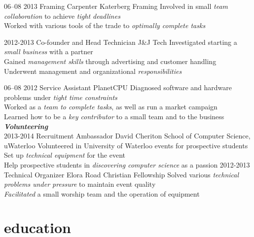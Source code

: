 \documentclass[]{friggeri-cv}
\newcommand{\imp}[1] {{\em #1}}
\begin{document}
\begin{entrylist}

  \entry
    {06–08 2013}
    {Framing Carpenter}
    {Katerberg Framing}
    {Involved in small \imp{team collaboration} to achieve \imp{tight deadlines} \\
    Worked with various tools of the trade to \imp{optimally complete tasks}  
   }

  \entry
  	{2012-2013}
  	{Co-founder and Head Technician}
  	{J\&J Tech}
  	{Investigated starting a \imp{small business} with a partner \\
	Gained \imp{management skills} through advertising and customer handling \\
	Underwent management and organizational \imp{responsibilities}}
	
  \entry
    {06–08 2012}
    {Service Assistant}
    {PlanetCPU}
    {Diagnosed software and hardware problems under \imp{tight time constraints} \\	Worked as a \imp{team to complete tasks}, as well as run a market campaign \\
    Learned how to be a \imp{key contributor} to a small team and to the business}
\textbf{\emph{Volunteering}} \\    
  \entry
  	{2013-2014}
  	{Recruitment Ambassador}
  	{David Cheriton School of Computer Science, uWaterloo}
	{Volunteered in University of Waterloo events for prospective students \\
  	Set up \imp{technical equipment}  for the event \\
	Help prospective students in \imp{discovering computer science} as a passion}
  \entry
  	{2012-2013}
  	{Technical Organizer}
  	{Elora Road Christian Fellowship}
	{Solved various \imp{technical problems under pressure} to maintain event quality\\
	\imp{Facilitated} a small worship team and the operation of equipment}
  	

\end{entrylist}

\newpage

\section{education}
\end{document}
